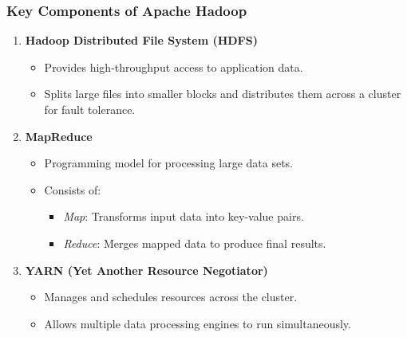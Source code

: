 \documentclass[aspectratio=169]{beamer}
\begin{document}
\begin{frame}[fragile]
    \frametitle{Key Components of Apache Hadoop}
    \begin{enumerate}
        \item \textbf{Hadoop Distributed File System (HDFS)}
        \begin{itemize}
            \item Provides high-throughput access to application data.
            \item Splits large files into smaller blocks and distributes them across a cluster for fault tolerance.
        \end{itemize}

        \item \textbf{MapReduce}
        \begin{itemize}
            \item Programming model for processing large data sets.
            \item Consists of:
            \begin{itemize}
                \item \textit{Map}: Transforms input data into key-value pairs.
                \item \textit{Reduce}: Merges mapped data to produce final results.
            \end{itemize}
        \end{itemize}

        \item \textbf{YARN (Yet Another Resource Negotiator)}
        \begin{itemize}
            \item Manages and schedules resources across the cluster.
            \item Allows multiple data processing engines to run simultaneously.
        \end{itemize}
    \end{enumerate}
\end{frame}
\end{document}
